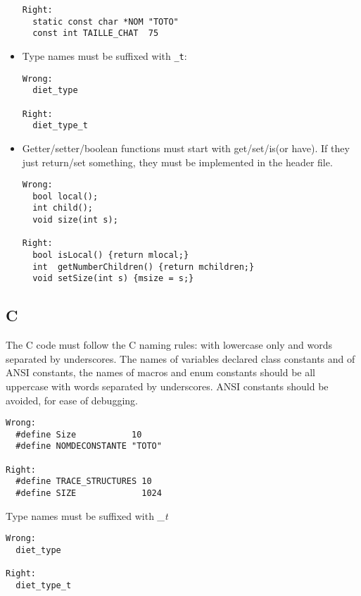 \documentclass{article}
\begin{document}
\begin{itemize}
\begin{verbatim}
Right:
  static const char *NOM "TOTO"
  const int TAILLE_CHAT  75
\end{verbatim}

\item Type names must be suffixed with \texttt{\_t}: \\
\begin{verbatim}
Wrong:
  diet_type

Right:
  diet_type_t
\end{verbatim}
\item Getter/setter/boolean functions must start with get/set/is(or have).
If they just return/set something, they must be implemented in the header
file.
\begin{verbatim}
Wrong:
  bool local();
  int child();
  void size(int s);

Right:
  bool isLocal() {return mlocal;} 
  int  getNumberChildren() {return mchildren;}
  void setSize(int s) {msize = s;}
\end{verbatim}

\end{itemize}

\subsection{C}
The C code must follow the C naming rules:
 with lowercase only and words separated by underscores.
The names of variables declared class constants and of ANSI constants,
 the names of macros and enum constants should be all uppercase with words
 separated by underscores. ANSI constants should be avoided, for ease of
 debugging.
\begin{verbatim}
Wrong:
  #define Size           10
  #define NOMDECONSTANTE "TOTO"

Right:
  #define TRACE_STRUCTURES 10
  #define SIZE             1024
\end{verbatim}

Type names must be suffixed with \textit{\_t}
\begin{verbatim}
Wrong:
  diet_type

Right:
  diet_type_t
\end{verbatim}
\end{document}
